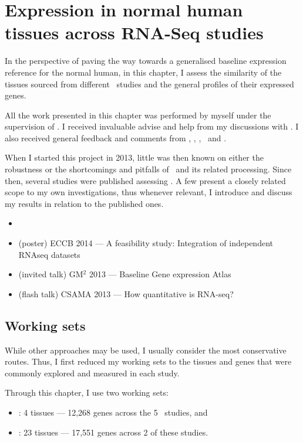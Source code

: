 \chapter{Expression in normal human tissues across RNA-Seq studies}
\label{ch:Transcriptomics}

In the perspective of paving the way towards
a generalised baseline expression reference for the normal human,
in this chapter, I assess the similarity
of the tissues sourced from different \Rnaseq\ studies and
the general profiles of their expressed genes.

All the work presented in this chapter was performed by myself under the
supervision of \alvis.
I received invaluable advise and help from my discussions with \nuno.
I also received general feedback and comments from \mar, \johan, \sarah, \gos\
and \wolfgang.

When I started this project in 2013,
little was then known on either the robustness or
the shortcomings and pitfalls of \Rnaseq\ and
its related processing.
Since then, several studies were published assessing \Rnaseq.
A few present a closely related scope to my own investigations, thus
whenever relevant,
I introduce and discuss my results in relation to the published ones.


\derivativeWork{}
\begin{itemize}[topsep=0pt,nosep]
    \item {}
    \item (poster) ECCB 2014 --- A feasibility study:
        Integration of independent RNAseq datasets
    \item (invited talk) GM$^2$ 2013 --- Baseline Gene expression Atlas
    \item (flash talk) CSAMA 2013 --- How quantitative is RNA-seq?
\end{itemize}

\clearpage

\section{Working sets}

While other approaches may be used,
I usually consider the most conservative routes.
Thus, I first reduced my working sets to the tissues and genes that were
commonly explored and measured in each study.

Through this chapter, I use two working sets:
\begin{itemize}[topsep=0pt,nosep]
    \item \setOne: 4 tissues --- 12,268 genes across the 5 \Rnaseq\ studies, and
    \item \setTwo: 23 tissues --- 17,551 genes across 2 of these studies.
\end{itemize}

